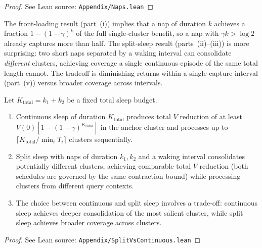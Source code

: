 \begin{proof}
\leanok
{}
See Lean source: \texttt{Appendix/Naps.lean}
\end{proof}

\begin{remark}
\label{rem:naps}
\leanok
{}
The front-loading result (part~(i)) implies that a nap of duration $k$ achieves a fraction $1 - (1-\gamma)^k$ of the full single-cluster benefit, so a nap with $\gamma k > \log 2$ already captures more than half.  The split-sleep result (parts~(ii)--(iii)) is more surprising: two short naps separated by a waking interval can consolidate \emph{different} clusters, achieving coverage a single continuous episode of the same total length cannot.  The tradeoff is diminishing returns within a single capture interval (part~(v)) versus broader coverage across intervals.
\end{remark}

\begin{corollary}
\label{cor:split_vs_continuous}
\leanok
{}
Let $K_{\mathrm{total}} = k_1 + k_2$ be a fixed total sleep budget.
\begin{enumerate}
\item Continuous sleep of duration $K_{\mathrm{total}}$ produces total
$V$ reduction of at least $V(0)[1 - (1-\gamma)^{K_{\mathrm{total}}}]$ in
the anchor cluster and processes up to
$\lceil K_{\mathrm{total}} / \min_i T_i \rceil$ clusters sequentially.
\item Split sleep with naps of duration $k_1, k_2$ and a waking interval
consolidates potentially different clusters, achieving comparable total
$V$ reduction (both schedules are governed by the same contraction
bound) while processing clusters from different query contexts.
\item The choice between continuous and split sleep involves a
trade-off: continuous sleep achieves deeper consolidation of the
most salient cluster, while split sleep achieves broader coverage
across clusters.
\end{enumerate}
\end{corollary}

\begin{proof}
\leanok
{}
See Lean source: \texttt{Appendix/SplitVsContinuous.lean}
\end{proof}
